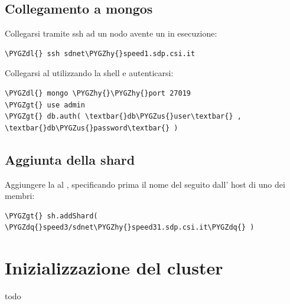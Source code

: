 \documentclass[a4paper,10pt,english]{sphinxmanual}
\def\PYGZus{\char`\_}
\def\PYGZgt{\char`\>}
\def\PYGZdl{\char`\$}
\def\PYGZhy{\char`\-}
\def\PYGZdq{\char`\"}
\begin{document}
\section{Collegamento a mongos}
\label{cluster_architecture/add_shard:collegamento-a-mongos}
Collegarsi tramite ssh ad un nodo avente un {\hyperref[cluster_architecture/architecture:mongos]{\emph{}}} in esecuzione:

\begin{Verbatim}[commandchars=\\\{\}]
\PYGZdl{} ssh sdnet\PYGZhy{}speed1.sdp.csi.it
\end{Verbatim}

Collegarsi al {\hyperref[cluster_architecture/architecture:mongos]{\emph{}}} utilizzando la shell  e autenticarsi:

\begin{Verbatim}[commandchars=\\\{\}]
\PYGZdl{} mongo \PYGZhy{}\PYGZhy{}port 27019
\PYGZgt{} use admin
\PYGZgt{} db.auth( \textbar{}db\PYGZus{}user\textbar{} , \textbar{}db\PYGZus{}password\textbar{} )
\end{Verbatim}


\section{Aggiunta della shard}
\label{cluster_architecture/add_shard:aggiunta-della-shard}
Aggiungere la {\hyperref[cluster_architecture/architecture:shard]{\emph{}}} al {\hyperref[cluster_architecture/architecture:cluster]{\emph{}}}, specificando prima il nome del {\hyperref[cluster_architecture/architecture:replica-set]{\emph{}}}
seguito dall' host di uno dei membri:

\begin{Verbatim}[commandchars=\\\{\}]
\PYGZgt{} sh.addShard( \PYGZdq{}speed3/sdnet\PYGZhy{}speed31.sdp.csi.it\PYGZdq{} )
\end{Verbatim}


\chapter{Inizializzazione del cluster}
\label{cluster_architecture/init_cluster:inizializzazione-del-cluster}\label{cluster_architecture/init_cluster:init-cluster}\label{cluster_architecture/init_cluster::doc}
todo



\renewcommand{\indexname}{Index}
\printindex
\end{document}
